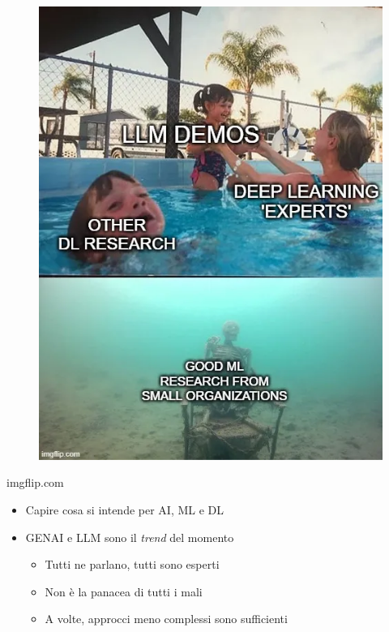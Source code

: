 \begin{frame}[t,fragile]
{\begin{minipage}[b]{\textwidth}
\begin{minipage}[b]{0.33\textwidth}
\begin{figure}[ht]
                \includegraphics[width=\textwidth]{img/meme-1.png}
            \end{figure}
            \begin{flushright}
                \vspace*{-7pt}
                {\tiny\textcopyright imgflip.com}
            \end{flushright}
        \end{minipage}
    \end{minipage}
    \begin{itemize}[leftmargin=10pt,align=right]
        \item[\alert{\faHandORight}] Capire cosa si intende per AI, ML e DL
        \item[\alert{\faHandORight}] GENAI e LLM sono il \textit{trend} del momento
        \begin{itemize}[leftmargin=10pt,align=right]
            \item[\alert{\faHandORight}] Tutti ne parlano, tutti sono esperti
            \item[\alert{\faHandORight}] \alert{Non} è la panacea di tutti i mali
            \item[\alert{\faHandORight}] A volte, approcci meno complessi sono sufficienti
        \end{itemize}
    \end{itemize}
}
\end{frame}

